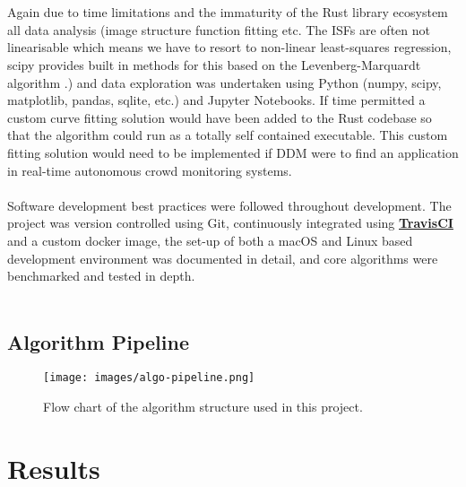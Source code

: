 \documentclass[11pt]{article}
\let\oldhref\href
\renewcommand{\href}[2]{\oldhref{#1}{\bfseries#2}}
\begin{document}
\\\\
Again due to time limitations and the immaturity of the Rust library ecosystem all data analysis (image structure function fitting etc. The ISFs are often not linearisable which means we have to resort to non-linear least-squares regression, scipy provides built in methods for this based on the Levenberg-Marquardt algorithm \cite{scipy_fit}.) and data exploration was undertaken using Python (numpy, scipy, matplotlib, pandas, sqlite, etc.) and Jupyter Notebooks. If time permitted a custom curve fitting solution would have been added to the Rust codebase so that the algorithm could run as a totally self contained executable. This custom fitting solution would need to be implemented if DDM were to find an application in real-time autonomous crowd monitoring systems.
\\\\
Software development best practices were followed throughout development. The project was version controlled using Git, continuously integrated using \href{https://travis-ci.com}{TravisCI} and a custom docker image, the set-up of both a macOS and Linux based development environment was documented in detail, and core algorithms were benchmarked and tested in depth.
\\\\
\subsection{Algorithm Pipeline}
\begin{figure}[H]
\centering
\noindent \texttt{[image: images/algo-pipeline.png]}
\caption{Flow chart of the algorithm structure used in this project.}
\end{figure}
 

\section{Results}
\label{section:results}
\end{document}

